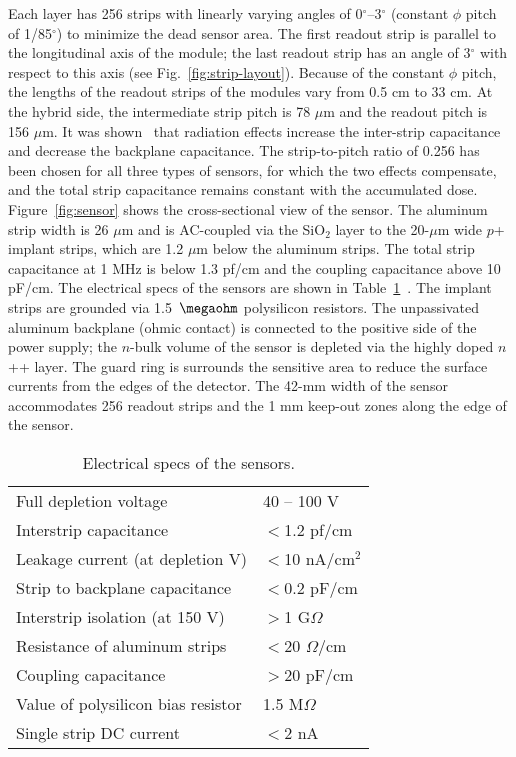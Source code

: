 Each layer has 256 strips with linearly varying angles of 0$^\circ$--3$^\circ$ (constant $\phi$ pitch of 1/85$^\circ$) to minimize the dead sensor area. The first readout strip is parallel to the longitudinal axis of the module; the last readout strip has an angle of 3$^\circ$ with respect to this axis (see Fig.~\ref{fig:strip-layout}). Because of the constant $\phi$ pitch, the lengths of the readout strips of the modules vary from 0.5 cm to 33 cm. At the hybrid side, the intermediate strip pitch is 78 $\mu$m and the readout pitch is 156 $\mu$m. It was shown~\cite{BRAIBANTNOTE} that radiation effects increase the inter-strip capacitance and decrease the backplane capacitance. The strip-to-pitch ratio of 0.256 has been chosen for all three types of sensors, for which the two effects compensate, and the total strip capacitance remains constant with the accumulated dose. Figure~\ref{fig:sensor} shows the cross-sectional view of the sensor. The aluminum strip width is 26 $\mu$m and is AC-coupled via the SiO$_2$ layer to the 20-$\mu$m wide $p$+ implant strips, which are 1.2 $\mu$m below the aluminum strips. The total strip capacitance at 1 MHz is below 1.3 pf/cm and the coupling capacitance above 10 pF/cm. The electrical specs of the sensors are shown in Table~\ref{tab:sensor-table}~\cite{SENSORNOTE}. The implant strips are grounded via 1.5~$\megaohm$ polysilicon resistors. The unpassivated aluminum backplane (ohmic contact) is connected to the positive side of the power supply; the $n$-bulk volume of the sensor is depleted via the highly doped $n$++ layer. The guard ring is surrounds the sensitive area to reduce the surface currents from the edges of the detector. The 42-mm width of the sensor accommodates 256 readout strips and the 1 mm keep-out zones along the edge of the sensor.

\begin{table}[hbt]
\begin{tabular}{ll}
\hline
Full depletion voltage      & 40 -- 100 V \\ 
Interstrip capacitance      & $<$1.2 pf/cm                       \\
Leakage current (at depletion V)        & $<$10 nA/cm$^2$                       \\
Strip to backplane capacitance        & $<$0.2 pF/cm                       \\
Interstrip isolation (at 150 V)           & $>$1 G$\Omega$                       \\ 
Resistance of aluminum strips        & $<$20 $\Omega$/cm                       \\
Coupling capacitance        & $>$20 pF/cm                       \\
Value of polysilicon bias resistor   & 1.5 M$\Omega$     \\
Single strip DC current & $<$2 nA\\ \hline
\end{tabular}
\caption{Electrical specs of the sensors.}
\label{tab:sensor-table}
\end{table}

